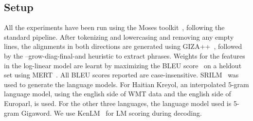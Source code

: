 \documentclass[11pt]{article}
\begin{document}

\subsection{Setup}
	All the experiments have been run using the Moses toolkit~\cite{Koehn:07}, following the standard pipeline. After tokenizing and lowercasing and removing any empty lines, the alignments in both directions are generated using GIZA++~\cite{OchNey:03}, followed by the --grow-diag-final-and heuristic to extract phrases. Weights for the features in the log-linear model are learnt by maximizing the BLEU score~\cite{Papineni:02} on a heldout set using MERT~\cite{Och:03}. All BLEU scores reported are case-insensitive. SRILM~\cite{Stolcke:02} was used to generate the language models. For Haitian Kreyol, an interpolated 5-gram language model, using the english side of WMT data and the english side of Europarl, is used. For the other three languages, the language model used is 5-gram Gigaword. We use KenLM~\cite{Ken:11} for LM scoring during decoding. 
\end{document}
